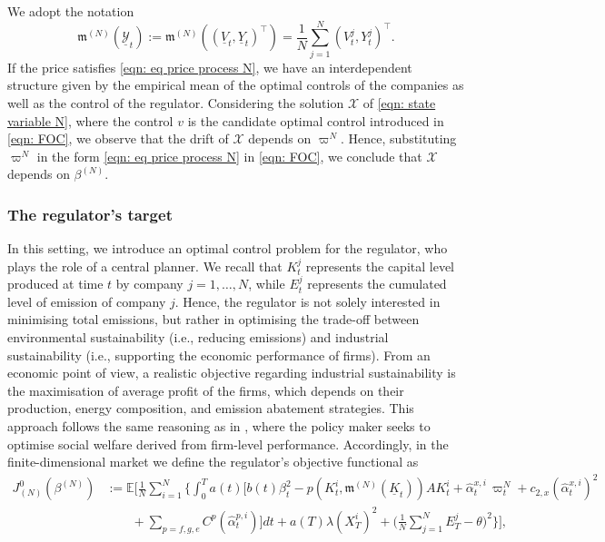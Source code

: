 \documentclass[10pt,a4paper]{amsart}
\numberwithin{equation}{section}
\newcommand{\w}{\varpi}
\newcommand{\E}{\mathbb{E}}
\renewcommand{\hat}{\widehat}
\newcommand{\avg}{\frac{1}{N}\sum_{j = 1}^N}
\begin{document}
We adopt the notation 
\begin{equation*}
\mathfrak{m}^{(N)}(\underline{\mathcal{Y}}_t) := \mathfrak{m}^{(N)}((\underline{V}_t,\underline{Y}_t)^\top) =\frac{1}{N} \sum_{j = 1}^N (V^j_t,Y^j_t)^\top.
\end{equation*}
If the price satisfies \eqref{eqn: eq price process N}, we have an interdependent structure given by the empirical mean of the optimal controls of the companies as well as the control of the regulator. Considering the solution $\mathcal{X}$ of \eqref{eqn: state variable N}, where the control $v$ is the candidate optimal control introduced in \eqref{eqn: FOC}, we observe that the drift of $\mathcal{X}$ depends on $\w^N$. Hence, substituting $\w^N$ in the form \eqref{eqn: eq price process N} in \eqref{eqn: FOC}, we conclude that $\mathcal{X}$ depends on $\beta^{(N)}$. 



\subsubsection{The regulator's target}

In this setting, we introduce an optimal control problem for the regulator, who plays the role of a central planner. We recall that $K^j_t$ represents the capital level produced at time $t$ by company $j = 1,\dots,N$, while $E^j_t$ represents the cumulated level of emission of company $j$. Hence, the regulator is not solely interested in minimising total emissions, but rather in optimising the trade-off between environmental sustainability (i.e., reducing emissions) and industrial sustainability (i.e., supporting the economic performance of firms). 
From an economic point of view, a realistic objective regarding industrial sustainability is the maximisation of average profit of the firms, which depends on their production, energy composition, and emission abatement strategies. This approach follows the same reasoning as in \cite[equation (8)]{aid2023optimal}, where the policy maker seeks to optimise social welfare derived from firm-level performance. Accordingly, in the finite-dimensional market we define the regulator’s objective functional as
\begin{align}
\label{eqn: target-reg-N}
    J^0_{(N)}(\beta^{(N)})
    & :=\E\Bigg[\frac{1}{N}\sum_{i = 1}^N \Bigg\{ \int_0^T a(t)\bigg[
    b(t)\beta_t^2-p(K^i_t, \mathfrak{m}^{(N)}(\underline{K}_t)) A K^i_t 
    + \hat{\alpha}^{x,i}_t \, \w^N_t + c_{2,x}(\hat{\alpha}^{x,i}_t)^2 
     \\
    \nonumber&\qquad
    + \sum_{p = f,g,e} C^p(\hat{\alpha}^{p,i}_t)
    \bigg] dt+ a(T)\lambda (X^i_T)^2 + \Bigg( \avg E^j_T - \theta\Bigg)^2 \Bigg\} \Bigg],
\end{align}
\end{document}
